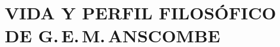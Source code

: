 \documentclass[../main.tex]{subfiles}
\begin{document}
\setcounter{chapter}{1}

\chapter{VIDA Y PERFIL FILOSÓFICO DE G.\,E.\,M.\,ANSCOMBE}






\end{document}
